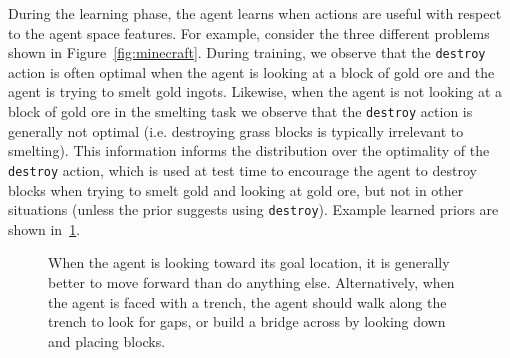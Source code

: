 \documentclass[11pt]{article}
\begin{document}
During the learning phase, the agent learns when actions are useful
with respect to the agent space features.  For example, consider the three different
problems shown in Figure~\ref{fig:minecraft}.  During training, we observe
that the \texttt{destroy} action is often optimal when the agent is
looking at a block of gold ore and the agent is trying to smelt gold
ingots.  Likewise, when the agent is not looking at a block of gold
ore in the smelting task we observe that the \texttt{destroy} action
is generally not optimal (i.e. destroying grass blocks is typically
irrelevant to smelting).  This information informs the distribution
over the optimality of the \texttt{destroy} action, which is used at
test time to encourage the agent to destroy blocks when trying to
smelt gold and looking at gold ore, but not in other situations
(unless the prior suggests using \texttt{destroy}). Example
learned priors are shown in~\ref{fig:example_affs}.

\begin{figure}
\centering
{}
\label{fig:example_affs}
\caption{When the agent is looking toward its goal location, it is generally better to move forward than do anything else. Alternatively, when the agent is faced with a trench, the agent should walk along the trench to look for gaps, or build a bridge across by looking down and placing blocks.}
\end{figure}
\end{document}
